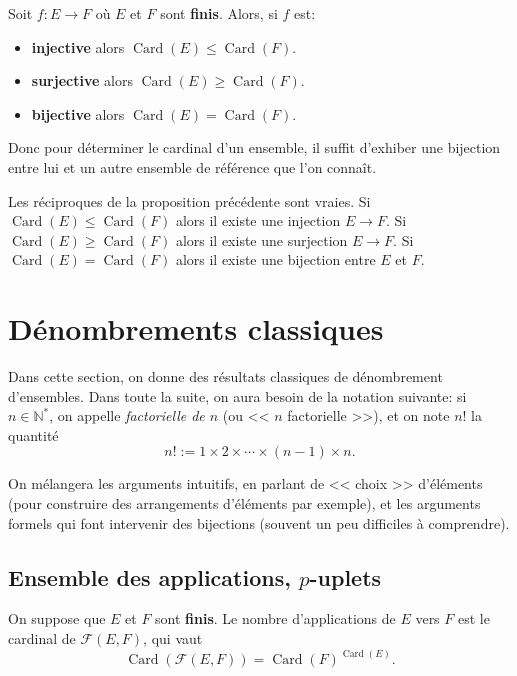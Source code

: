 \documentclass[11pt]{article}
\newcommand{\N}{\mathbb N}
\DeclareMathOperator{\Card}{\mathrm{Card}}
\theoremstyle{definition}
\theoremstyle{remark}
\theoremstyle{theorem}
\begin{document}
\begin{prop}
	Soit $f:E\rightarrow F$ où $E$ et $F$ sont \textbf{finis}. Alors, si $f$ est:
	\begin{itemize}
		\item \textbf{injective} alors $\Card(E)\leq \Card(F)$.
		\item \textbf{surjective} alors $\Card(E)\geq \Card(F)$.
		\item \textbf{bijective} alors $\Card(E) = \Card(F)$.
	\end{itemize}
\end{prop}

Donc pour déterminer le cardinal d'un ensemble, il suffit d'exhiber une bijection entre lui et un autre ensemble de référence que l'on connaît.

Les réciproques de la proposition précédente sont vraies. Si $\Card(E)\leq\Card(F)$ alors il existe une injection $E\rightarrow F$. Si $\Card(E)\geq\Card(F)$ alors il existe une surjection $E\rightarrow F$. Si $\Card(E)=\Card(F)$ alors il existe une bijection entre $E$ et $F$.

\section{Dénombrements classiques}

Dans cette section, on donne des résultats classiques de dénombrement d'ensembles. Dans toute la suite, on aura besoin de la notation suivante: si $n\in\N^*$, on appelle \textit{factorielle de $n$} (ou << $n$ factorielle >>), et on note $n!$ la quantité
\[
n! := 1\times2\times \cdots \times (n-1)\times n.
\]

On mélangera les arguments intuitifs, en parlant de << choix >> d'éléments (pour construire des arrangements d'éléments par exemple), et les arguments formels qui font intervenir des bijections (souvent un peu difficiles à comprendre).

\subsection{Ensemble des applications, $p$-uplets}

\begin{prop}
	On suppose que $E$ et $F$ sont \textbf{finis}. Le nombre d'applications de $E$ vers $F$ est le cardinal de $\mathcal F(E,F)$, qui vaut
	\[
	\Card(\mathcal{F}(E,F)) = \Card(F)^{\Card(E)}.
	\]
\end{prop}
\end{document}
